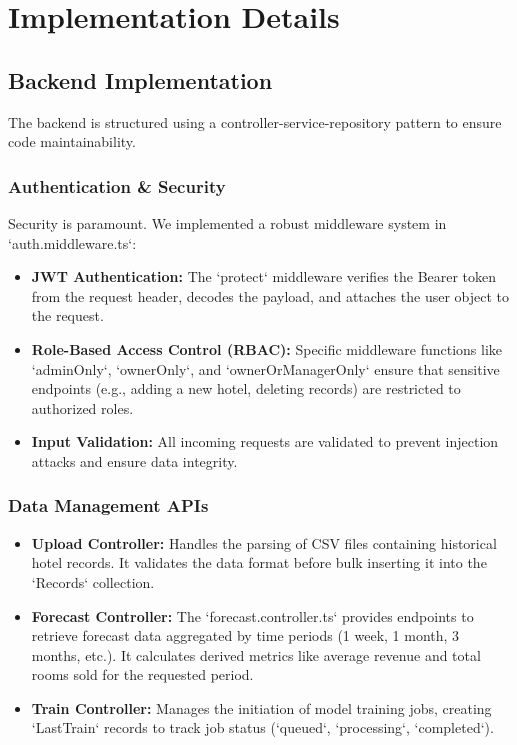 \documentclass[letterpaper,11pt]{report}
\begin{document}
\chapter{Implementation Details}

\section{Backend Implementation}
The backend is structured using a controller-service-repository pattern to ensure code maintainability.

\subsection{Authentication \& Security}
Security is paramount. We implemented a robust middleware system in `auth.middleware.ts`:
\begin{itemize}
    \item \textbf{JWT Authentication:} The `protect` middleware verifies the Bearer token from the request header, decodes the payload, and attaches the user object to the request.
    \item \textbf{Role-Based Access Control (RBAC):} Specific middleware functions like `adminOnly`, `ownerOnly`, and `ownerOrManagerOnly` ensure that sensitive endpoints (e.g., adding a new hotel, deleting records) are restricted to authorized roles.
    \item \textbf{Input Validation:} All incoming requests are validated to prevent injection attacks and ensure data integrity.
\end{itemize}

\subsection{Data Management APIs}
\begin{itemize}
    \item \textbf{Upload Controller:} Handles the parsing of CSV files containing historical hotel records. It validates the data format before bulk inserting it into the `Records` collection.
    \item \textbf{Forecast Controller:} The `forecast.controller.ts` provides endpoints to retrieve forecast data aggregated by time periods (1 week, 1 month, 3 months, etc.). It calculates derived metrics like average revenue and total rooms sold for the requested period.
    \item \textbf{Train Controller:} Manages the initiation of model training jobs, creating `LastTrain` records to track job status (`queued`, `processing`, `completed`).
\end{itemize}
\end{document}

